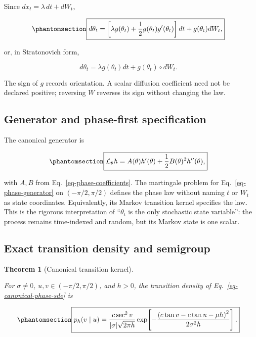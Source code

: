 \documentclass[
  english,
  10pt,
  letterpaper,
  DIV=11,
  numbers=noendperiod]{scrartcl}
\theoremstyle{definition}
\theoremstyle{plain}
\newtheorem{theorem}{Theorem}[section]
\theoremstyle{plain}
\theoremstyle{remark}
\begin{document}
Since \(dx_t=\lambda\,dt+dW_t\),

\begin{equation}\protect\phantomsection\label{eq-general-phase-sde}{
\boxed{
d\theta_t
=
\left[
\lambda g(\theta_t)
+\frac12g(\theta_t)g'(\theta_t)
\right]dt
+g(\theta_t)dW_t,
}
}\end{equation}

or, in Stratonovich form,

\[
d\theta_t
=\lambda g(\theta_t)dt+g(\theta_t)\circ dW_t.
\]

The sign of \(g\) records orientation. A scalar diffusion coefficient
need not be declared positive; reversing \(W\) reverses its sign without
changing the law.

\subsection{Generator and phase-first
specification}\label{generator-and-phase-first-specification}

The canonical generator is

\begin{equation}\protect\phantomsection\label{eq-phase-generator}{
\boxed{
\mathcal L_\theta h
=A(\theta)h'(\theta)
+\frac12B(\theta)^2h''(\theta),
}
}\end{equation}

with \(A,B\) from Eq.~\ref{eq-phase-coefficients}. The martingale
problem for Eq.~\ref{eq-phase-generator} on \((-\pi/2,\pi/2)\) defines
the phase law without naming \(t\) or \(W_t\) as state coordinates.
Equivalently, its Markov transition kernel specifies the law. This is
the rigorous interpretation of ``\(\theta_t\) is the only stochastic
state variable'': the process remains time-indexed and random, but its
Markov state is one scalar.

\subsection{Exact transition density and
semigroup}\label{exact-transition-density-and-semigroup}

\begin{theorem}[Canonical transition
kernel]\protect\hypertarget{thm-phase-kernel}{}\label{thm-phase-kernel}

For \(\sigma\ne0\), \(u,v\in(-\pi/2,\pi/2)\), and \(h>0\), the
transition density of Eq.~\ref{eq-canonical-phase-sde} is

\begin{equation}\protect\phantomsection\label{eq-phase-kernel}{
\boxed{
p_h(v\mid u)
=
\frac{c\sec^2v}{|\sigma|\sqrt{2\pi h}}
\exp\!\left[
-\frac{
\left(c\tan v-c\tan u-\mu h\right)^2
}{2\sigma^2h}
\right].
}
}\end{equation}

\end{theorem}
\end{document}
